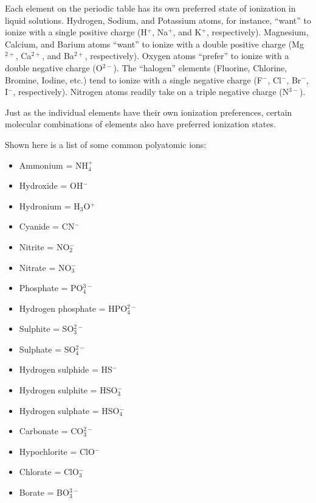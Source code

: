 

Each element on the periodic table has its own preferred state of ionization in liquid solutions.  Hydrogen, Sodium, and Potassium atoms, for instance, ``want'' to ionize with a single positive charge (H$^{+}$, Na$^{+}$, and K$^{+}$, respectively).  Magnesium, Calcium, and Barium atoms ``want'' to ionize with a double positive charge (Mg$^{2+}$, Ca$^{2+}$, and Ba$^{2+}$, respectively).  Oxygen atoms ``prefer'' to ionize with a double negative charge (O$^{2-}$).  The ``halogen'' elements (Fluorine, Chlorine, Bromine, Iodine, etc.) tend to ionize with a single negative charge (F$^{-}$, Cl$^{-}$, Br$^{-}$, I$^{-}$, respectively).  Nitrogen atoms readily take on a triple negative charge (N$^{3-}$).  

\vskip 10pt

Just as the individual elements have their own ionization preferences, certain molecular combinations of elements also have preferred ionization states.

Shown here is a list of some common polyatomic ions:

\begin{itemize}
\item{} Ammonium = NH$_{4}^{+}$
\vskip 5pt
\item{} Hydroxide = OH$^{-}$
\vskip 5pt
\item{} Hydronium = H$_{3}$O$^{+}$
\vskip 5pt
\item{} Cyanide = CN$^{-}$
\vskip 5pt
\item{} Nitrite = NO$_{2}^{-}$
\vskip 5pt
\item{} Nitrate = NO$_{3}^{-}$
\vskip 5pt
\item{} Phosphate = PO$_{4}^{3-}$
\vskip 5pt
\item{} Hydrogen phosphate = HPO$_{4}^{2-}$
\vskip 5pt
\item{} Sulphite = SO$_{3}^{2-}$
\vskip 5pt
\item{} Sulphate = SO$_{4}^{2-}$
\vskip 5pt
\item{} Hydrogen sulphide = HS$^{-}$
\vskip 5pt
\item{} Hydrogen sulphite = HSO$_{3}^{-}$
\vskip 5pt
\item{} Hydrogen sulphate = HSO$_{4}^{-}$
\vskip 5pt
\item{} Carbonate = CO$_{3}^{2-}$
\vskip 5pt
\item{} Hypochlorite = ClO$^{-}$
\vskip 5pt
\item{} Chlorate = ClO$_{3}^{-}$
\vskip 5pt
\item{} Borate = BO$_{3}^{3-}$
\end{itemize}

